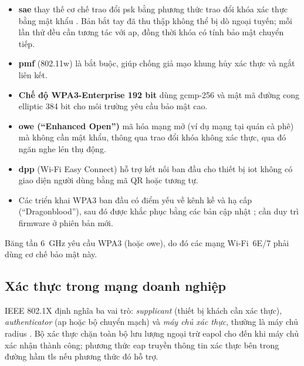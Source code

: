 \begin{itemize}
  \item \textbf{\ac{sae}} thay thế cơ chế trao đổi \ac{psk} bằng phương thức
    trao đổi khóa xác thực bằng mật khẩu \cite{wpa3_overview, wpa3spec}. Bản bắt tay đã thu thập không thể bị
    dò ngoại tuyến; mỗi lần thử đều cần tương tác với \ac{ap}, đồng thời khóa
    có tính bảo mật chuyển tiếp.
  \item \textbf{\ac{pmf}} (802.11w) là bắt buộc, giúp chống giả mạo khung
    hủy xác thực và ngắt liên kết.
  \item \textbf{Chế độ WPA3-Enterprise 192 bit} dùng \ac{gcmp}-256 và mật mã
    đường cong elliptic 384 bit cho môi trường yêu cầu bảo mật cao.
  \item \textbf{\ac{owe} (``Enhanced Open'')} \cite{rfc8110, wpa3_deployment} mã hóa mạng mở
    (ví dụ mạng tại quán cà phê) mà không cần mật khẩu, thông qua trao đổi khóa
    không xác thực, qua đó ngăn nghe lén thụ động.
  \item \textbf{\ac{dpp}} (Wi-Fi Easy Connect) hỗ trợ kết nối ban đầu cho
    thiết bị \ac{iot} không có giao diện người dùng bằng mã QR hoặc tương tự.
  \item Các triển khai WPA3 ban đầu có điểm yếu về kênh kề và hạ cấp
    (``Dragonblood''), sau đó được khắc phục bằng các bản cập nhật
    \cite{dragonblood2020, wpa3_deployment}; cần duy trì firmware ở phiên bản mới.
\end{itemize}
Băng tần 6~GHz yêu cầu WPA3 (hoặc \ac{owe}), do đó các mạng Wi-Fi~6E/7 phải
dùng cơ chế bảo mật này.

\subsection{Xác thực trong mạng doanh nghiệp}

IEEE 802.1X \cite{ieee8021x} định nghĩa ba vai trò: \emph{supplicant} (thiết
bị khách cần xác thực), \emph{authenticator} (\ac{ap} hoặc bộ chuyển mạch) và
\emph{máy chủ xác thực}, thường là máy chủ \ac{radius} \cite{rfc2865}. Bộ xác
thực chặn toàn bộ lưu lượng ngoại trừ \ac{eapol} cho đến khi máy chủ xác nhận
thành công; phương thức \ac{eap} \cite{rfc3748} truyền thông tin xác thực bên
trong đường hầm \ac{tls} nếu phương thức đó hỗ trợ.


